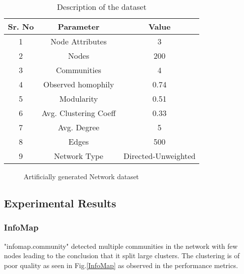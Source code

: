 \begin{table}[H]
\renewcommand{\arraystretch}{1.3}
\caption{Description of the dataset}
\label{table}
\centering
\begin{tabular}{|c|c|c|}
  \hline
\multicolumn{1}{|c|}{\textbf{Sr. No}} & \multicolumn{1}{c|}{\textbf{Parameter}} & \multicolumn{1}{c|}{\textbf{Value}} \\
  \hline
  1 & Node Attributes &  3 \\
   \hline
  2 & Nodes &  200 \\
   \hline
  3 & Communities &  4 \\
   \hline
  4 & Observed homophily &  0.74 \\
   \hline
  5 & Modularity &  0.51 \\
   \hline
  6 & Avg. Clustering Coeff &  0.33 \\
   \hline
  7 & Avg. Degree &  5 \\
   \hline
  8 & Edges &  500 \\
   \hline
  9 & Network Type &  Directed-Unweighted \\
  \hline
\end{tabular}
\end{table}

\begin{figure}[H]
\centering
{}
\caption{Artificially generated Network dataset}
\end{figure}

\subsection{Experimental Results}

\subsubsection{InfoMap}
"infomap.community" detected multiple communities in the network with few nodes leading to the conclusion that it split large clusters. The clustering is of poor quality as seen in Fig.\ref{InfoMap} as observed in the performance metrics.

